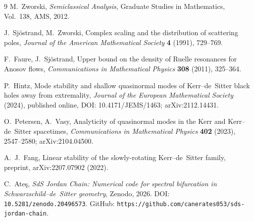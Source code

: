 \documentclass[12pt,a4paper]{amsart}
\theoremstyle{remark}
\begin{document}
\begin{thebibliography}{9}
M.~Zworski,
\textit{Semiclassical Analysis},
Graduate Studies in Mathematics, Vol.~138, AMS, 2012.

J.~Sj\"{o}strand, M.~Zworski,
Complex scaling and the distribution of scattering poles,
\textit{Journal of the American Mathematical Society} \textbf{4} (1991), 729--769.

F.~Faure, J.~Sj\"{o}strand,
Upper bound on the density of Ruelle resonances for Anosov flows,
\textit{Communications in Mathematical Physics} \textbf{308} (2011), 325--364.

P.~Hintz,
Mode stability and shallow quasinormal modes of Kerr--de~Sitter black holes
away from extremality,
\textit{Journal of the European Mathematical Society} (2024), published online,
DOI: 10.4171/JEMS/1463; arXiv:2112.14431.

O.~Petersen, A.~Vasy,
Analyticity of quasinormal modes in the Kerr and Kerr--de~Sitter spacetimes,
\textit{Communications in Mathematical Physics} \textbf{402} (2023), 2547--2580;
arXiv:2104.04500.

A.~J.~Fang,
Linear stability of the slowly-rotating Kerr--de~Sitter family,
preprint, arXiv:2207.07902 (2022).

C.~Ate\c{s},
\textit{SdS Jordan Chain: Numerical code for spectral bifurcation
in Schwarzschild--de~Sitter geometry},
Zenodo, 2026.
DOI: \texttt{10.5281/zenodo.20496573}.
GitHub: \texttt{https://github.com/canerates053/sds-jordan-chain}.

\end{thebibliography}
\end{document}
